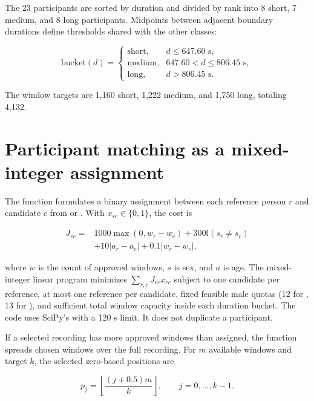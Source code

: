 The 23 \FTD{} participants are sorted by duration and divided by rank into 8
short, 7 medium, and 8 long participants. Midpoints between adjacent boundary
durations define thresholds shared with the other classes:

\begin{equation}
\text{bucket}(d)=
\begin{cases}
\text{short}, & d\leq647.60\text{ s},\\
\text{medium}, & 647.60<d\leq806.45\text{ s},\\
\text{long}, & d>806.45\text{ s}.
\end{cases}
\end{equation}

The \FTD{} window targets are 1,160 short, 1,222 medium, and 1,750 long,
totaling 4,132.

\section{Participant matching as a mixed-integer assignment}

The function  formulates a binary assignment between each
\FTD{} reference person $r$ and candidate $c$ from \AD{} or \CN{}. With
$x_{rc}\in\{0,1\}$, the cost is

\begin{align}
J_{rc} ={}& 1000\max(0,w_r-w_c)
+300\mathbb{I}(s_r\neq s_c) \\
&+10|a_r-a_c|+0.1|w_r-w_c|,
\end{align}

where $w$ is the count of approved windows, $s$ is sex, and $a$ is age. The
mixed-integer linear program minimizes $\sum_{r,c}J_{rc}x_{rc}$ subject to one
candidate per reference, at most one reference per candidate, fixed feasible
male quotas (12 for \AD{}, 13 for \CN{}), and sufficient total window capacity
inside each duration bucket. The code uses SciPy's  with a 120 s
limit. It does not duplicate a participant.

If a selected recording has more approved windows than assigned, the function
 spreads chosen windows over the full
recording. For $m$ available windows and target $k$, the selected zero-based
positions are

\begin{equation}
p_j=\left\lfloor\frac{(j+0.5)m}{k}\right\rfloor,
\qquad j=0,\ldots,k-1.
\end{equation}

